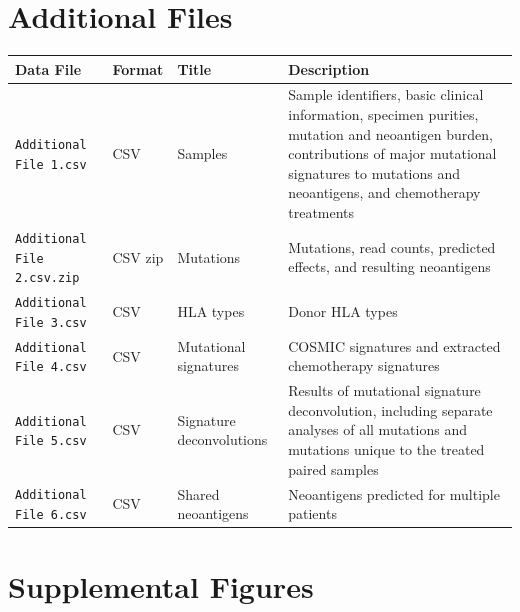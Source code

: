 
\section*{Additional Files}

\setcounter{equation}{0}
\setcounter{figure}{0}
\setcounter{table}{0}
\makeatletter
\renewcommand{\theequation}{S\arabic{equation}}
\renewcommand{\thefigure}{S\arabic{figure}}

\begin{center}
    \begin{tabular}{ | l | l | l | p{5cm} |}
    \hline
    \textbf{Data File} & \textbf{Format} & \textbf{Title} & \textbf{Description} \\ \hline
    \texttt{Additional File 1.csv} & CSV & Samples & Sample identifiers, basic clinical information, specimen purities, mutation and neoantigen burden, contributions of major mutational signatures to mutations and neoantigens, and chemotherapy treatments \\ \hline

    \texttt{Additional File 2.csv.zip} & CSV zip & Mutations & Mutations, read counts, predicted effects, and resulting neoantigens \\ \hline
    
    \texttt{Additional File 3.csv} & CSV & HLA types & Donor HLA types \\ \hline
    
    \texttt{Additional File 4.csv} & CSV & Mutational signatures & COSMIC signatures and extracted chemotherapy signatures \\ \hline

    \texttt{Additional File 5.csv} & CSV & Signature deconvolutions & Results of mutational signature deconvolution, including separate analyses of all mutations and mutations unique to the treated paired samples  \\ \hline
    
    \texttt{Additional File 6.csv} & CSV & Shared neoantigens & Neoantigens predicted for multiple patients  \\ \hline
    \end{tabular}
\end{center}


\section*{Supplemental Figures}


